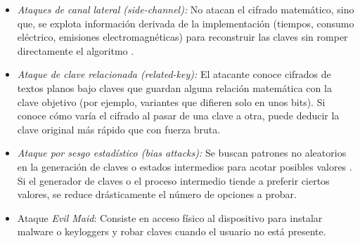 \begin{itemize}
  \item \emph{Ataques de canal lateral (side-channel):} No atacan el cifrado matemático, sino que, se explota información derivada de la implementación (tiempos, consumo eléctrico, emisiones electromagnéticas) para reconstruir las claves sin romper directamente el algoritmo \cite{gfg-cryptanalysis}.
  \item \emph{Ataque de clave relacionada (related-key):} El atacante conoce cifrados de textos planos bajo claves que guardan alguna relación matemática con la clave objetivo (por ejemplo, variantes que difieren solo en unos bits). Si conoce cómo varía el cifrado al pasar de una clave a otra, puede deducir la clave original más rápido que con fuerza bruta.
  \item \emph{Ataque por sesgo estadístico (bias attacks):} Se buscan patrones no aleatorios en la generación de claves o estados intermedios para acotar posibles valores \cite{checkpoint-modern-attacks}. Si el generador de claves o el proceso intermedio tiende a preferir ciertos valores, se reduce drásticamente el número de opciones a probar.
  \item Ataque \emph{Evil Maid}: Consiste en acceso físico al dispositivo para instalar malware o keyloggers y robar claves cuando el usuario no está presente.
\end{itemize}